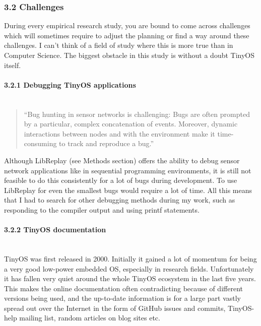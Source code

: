 \subsubsection{3.2 Challenges}\label{challenges}

During every empirical research study, you are bound to come across
challenges which will sometimes require to adjust the planning or find a
way around these challenges. I can't think of a field of study where
this is more true than in Computer Science. The biggest obstacle in this
study is without a doubt TinyOS itself.

\paragraph{3.2.1 Debugging TinyOS
applications\\\\}\label{debugging-tinyos-applications}

\begin{quote}
``Bug hunting in sensor networks is challenging: Bugs are often prompted
by a particular, complex concatenation of events. Moreover, dynamic
interactions between nodes and with the environment make it
time-consuming to track and reproduce a
bug\cite{landsiedel2015libreplay}.''
\end{quote}

Although LibReplay (see Methods section) offers the ability to debug
sensor network applications like in sequential programming environments,
it is still not feasible to do this consistently for a lot of bugs
during development. To use LibReplay for even the smallest bugs would
require a lot of time. All this means that I had to search for other
debugging methods during my work, such as responding to the compiler
output and using printf statements\cite{wiki2010tinyos}.

\paragraph{3.2.2 TinyOS documentation\\\\}\label{tinyos-documentation}

TinyOS was first released in 2000. Initially it gained a lot of momentum
for being a very good low-power embedded OS, especially in research
fields. Unfortunately it has fallen very quiet around the whole TinyOS
ecosystem in the last five years. This makes the online documentation
often contradicting because of different versions being used, and the
up-to-date information is for a large part vastly spread out over the
Internet in the form of GitHub issues and commits, TinyOS-help mailing
list, random articles on blog sites etc.

